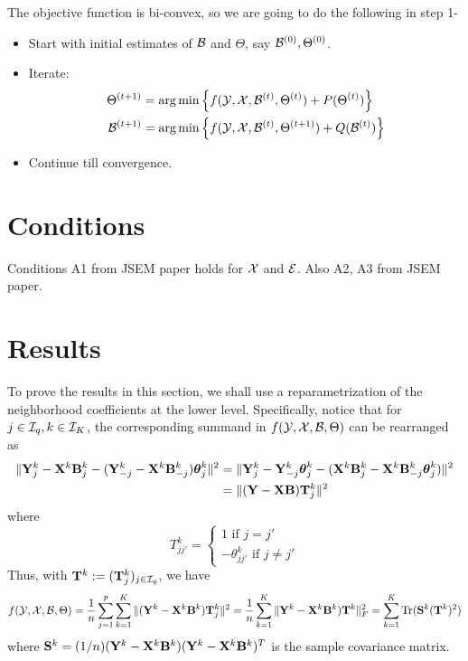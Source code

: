 \documentclass[12pt, letterpaper]{article}
\theoremstyle{definition}
\DeclareMathOperator*{\Tr}{Tr}
\DeclareMathOperator*{\argmin}{arg\,min}
\numberwithin{equation}{section}
\begin{document}
The objective function is bi-convex, so we are going to do the following in step 1-

\begin{itemize}
\item Start with initial estimates of ${\cal{B}}$ and $\Theta$, say ${\cal{B}}^{(0)}, \Theta^{(0)}$.
\item Iterate:
%
\begin{align}
\Theta^{(t+1)} &= \argmin \left\{ f ( \cY, \cX, \cB^{(t)}, \Theta^{(t)}) + P (\Theta^{(t)}) \right\}\\
\cB^{(t+1)} &= \argmin \left\{ f ( \cY, \cX, \cB^{(t)}, \Theta^{(t+1)}) + Q (\cB^{(t)}) \right\}
\end{align}
\item Continue till convergence.
\end{itemize}
%

\section{Conditions}
Conditions A1 from JSEM paper holds for ${\cal{X}}$ and ${\cal{E}}$. Also A2, A3 from JSEM paper.

\section{Results}
To prove the results in this section, we shall use a reparametrization of the neighborhood coefficients at the lower level. Specifically, notice that for $j \in {\cal{I}}_q, k \in {\cal{I}}_K$, the corresponding summand in $f({\cal{Y}}, {\cal{X}}, {\cal{B}}, \Theta)$ can be rearranged as
%
\begin{align*}
\| {\mathbf{Y}}^k_j - {\mathbf{X}}^k {\mathbf{B}}_j^k - ({\mathbf{Y}}_{-j}^k - {\mathbf{X}}^k {\mathbf{B}}_{-j}^k) {\boldsymbol{\theta}}_j^k \|^2 &=
\| {\mathbf{Y}}^k_j - {\mathbf{Y}}_{-j}^k {\boldsymbol{\theta}}_j^k - ({\mathbf{X}}^k {\mathbf{B}}_j^k -{\mathbf{X}}^k {\mathbf{B}}_{-j}^k {\boldsymbol{\theta}}_j^k) \|^2 \\
&= \| ( {\mathbf{Y}} - {\mathbf{X}} {\mathbf{B}} ) {\mathbf{T}}_j^k \|^2
\end{align*}
%
where
%
$$
T_{jj'}^k = \begin{cases}
1 \text{ if } j = j'\\
- \theta_{jj'}^k \text{ if } j \neq j'
\end{cases}
$$
%
Thus, with ${\mathbf{T}}^k := ({\mathbf{T}}_j^k)_{j \in {\cal{I}}_q}$, we have
$$
f( \cY, \cX, \cB, \Theta) = \frac{1}{n} \sum_{j=1}^p \sum_{k=1}^K \| ( \bfY^k - \bfX^k \bfB^k ) \bfT_j^k \|^2
= \frac{1}{n} \sum_{k=1}^K \| \bfY^k - \bfX^k \bfB^k ) \bfT^k \|_F^2
= \sum_{k=1}^K \Tr (\bfS^k (\bfT^k)^2 )
$$
%
where ${\mathbf{S}}^k = (1/n) ({\mathbf{Y}}^k - {\mathbf{X}}^k {\mathbf{B}}^k) ({\mathbf{Y}}^k - {\mathbf{X}}^k {\mathbf{B}}^k)^T$ is the sample covariance matrix.
\end{document}
